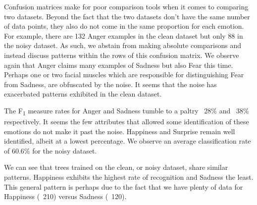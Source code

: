  

\newpage
Confusion matrices make for poor comparison tools when it comes to comparing two datasets.
Beyond the fact that the two datasets don't have the same number of data points,
they also do not come in the same proportion for each emotion. For example, there are 132 Anger examples in the clean dataset but only
88 in the noisy dataset. As such, we abstain from making absolute comparisons and instead discuss patterns within the rows
of this confusion matrix. We observe again that Anger claims many examples of Sadness but also Fear this time. Perhaps one or two facial
muscles which are responsible for distinguishing Fear from Sadness, are obfuscated by the noise.
It seems that the noise has exacerbated patterns exhibited in the clean dataset.



The F\textsubscript{1} measure rates for Anger and Sadness tumble to a paltry ~28\% and ~38\% respectively.
It seems the few attributes that allowed some identification of these emotions do not make it past the noise.
Happiness and Surprise remain well identified, albeit at a lowest percentage.
We observe an average classification rate of 60.6\% for the noisy dataset.


We can see that trees trained on the clean, or noisy dataset, share similar patterns.
Happiness exhibits the highest rate of recognition and Sadness the least.
This general pattern is perhaps due to the fact that we have plenty of data for Happiness (~210) versus Sadness (~120).



